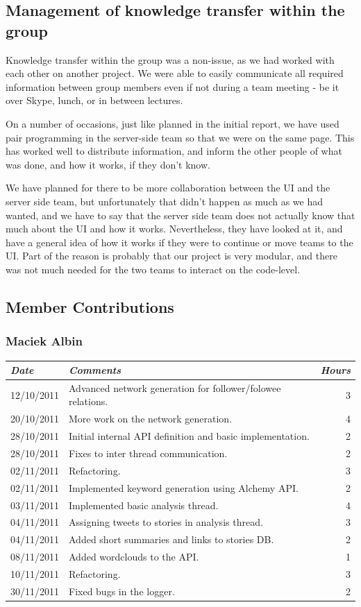\documentclass[a4paper,12pt]{article}
\begin{document}
		\subsection{Management of knowledge transfer within the group}
		
		Knowledge transfer within the group was a non-issue, as we had worked with each other on another project. We were able to easily communicate all required information between group members even if not during a team meeting - be it over Skype, lunch, or in between lectures.
		
		On a number of occasions, just like planned in the initial report, we have used pair programming in the server-side team so that we were on the same page. This has worked well to distribute information, and inform the other people of what was done, and how it works, if they don't know. 
		
		We have planned for there to be more collaboration between the UI and the server side team, but unfortunately that didn't happen as much as we had wanted, and we have to say that the server side team does not actually know that much about the UI and how it works. Nevertheless, they have looked at it, and have a general idea of how it works if they were to continue or move teams to the UI. Part of the reason is probably that our project is very modular, and there was not much needed for the two teams to interact on the code-level.
	
	\subsection{Member Contributions}
	  \subsubsection{Maciek Albin}
	    \begin{tabular}{l | p{10cm} r}
	     \emph{\large Date} & \emph{\large Comments} & \emph{\large Hours}\\
	     \hline
	     12/10/2011 & Advanced network generation for follower/folowee relations. & 3\\
	     20/10/2011 & More work on the network generation. & 4\\
	     28/10/2011 & Initial internal API definition and basic implementation. & 2\\
	     28/10/2011 & Fixes to inter thread communication. & 2\\
	     02/11/2011 & Refactoring. & 3\\
	     02/11/2011 & Implemented keyword generation using Alchemy API. & 2\\
	     03/11/2011 & Implemented basic analysis thread. & 4\\
	     04/11/2011 & Assigning tweets to stories in analysis thread. & 3\\
	     04/11/2011 & Added short summaries and links to stories DB. & 2\\
	     08/11/2011 & Added wordclouds to the API. & 1\\
	     10/11/2011 & Refactoring. & 3\\
	     30/11/2011 & Fixed bugs in the logger. & 2
	    \end{tabular}
	    
\end{document}
